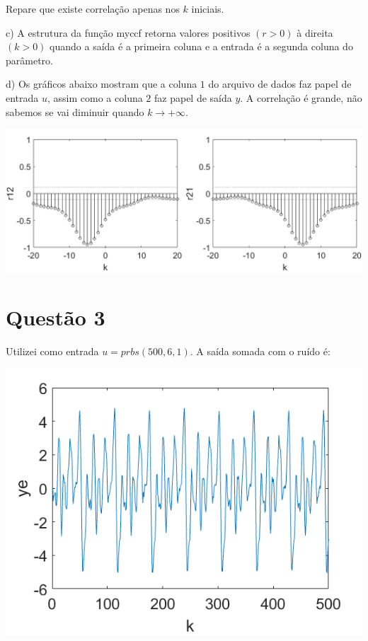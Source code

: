 \documentclass{rbfin}
\begin{document}
Repare que existe correlação apenas nos $k$ iniciais.

c) A estrutura da função myccf retorna valores positivos $(r > 0)$ à direita $(k > 0)$ quando a saída é a primeira coluna e a entrada é a segunda coluna do parâmetro.

d) Os gráficos abaixo mostram que a coluna $1$ do arquivo de dados faz papel de entrada $u$, assim como a coluna $2$ faz papel de saída $y$. A correlação é grande, não sabemos se vai diminuir quando $k \to +\infty$.

\begin{center}
\includegraphics[scale=0.65]{2d}
\end{center}

\newpage

\section*{Questão 3}

Utilizei como entrada $u = prbs(500,6,1)$. A saída somada com o ruído é:

\begin{center}
\includegraphics[scale=0.666]{3ye}
\end{center}
\end{document}
